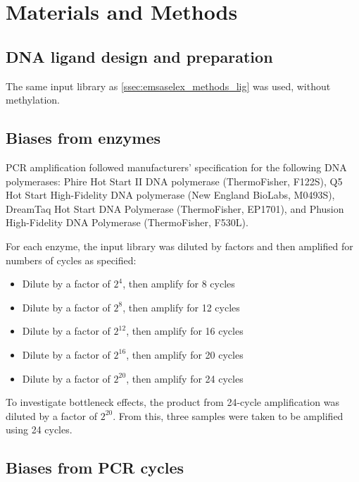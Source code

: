 \documentclass[parskip=full, numbers=noenddot]{scrreprt}
\begin{document}
\section{Materials and Methods}
\label{sec:pcrbias_methods}

\subsection{DNA ligand design and preparation}
\label{ssec:pcrbias_methods_lig}

The same input library as \ref{ssec:emsaselex_methods_lig} was used, without methylation.

\subsection{Biases from enzymes}
\label{ssec:pcrbias_methods_enz}

PCR amplification followed manufacturers' specification for the following DNA polymerases: Phire Hot Start II DNA polymerase (ThermoFisher, F122S), Q5 Hot Start High-Fidelity DNA polymerase (New England BioLabs, M0493S), DreamTaq Hot Start DNA Polymerase (ThermoFisher, EP1701), and Phusion High-Fidelity DNA Polymerase (ThermoFisher, F530L).

For each enzyme, the input library was diluted by factors and then amplified for numbers of cycles as specified:

\begin{itemize}
  \item Dilute by a factor of $2^{4}$, then amplify for 8 cycles
  \item Dilute by a factor of $2^{8}$, then amplify for 12 cycles
  \item Dilute by a factor of $2^{12}$, then amplify for 16 cycles
  \item Dilute by a factor of $2^{16}$, then amplify for 20 cycles
  \item Dilute by a factor of $2^{20}$, then amplify for 24 cycles
\end{itemize}
    
To investigate bottleneck effects, the product from 24-cycle amplification was diluted by a factor of $2^{20}$.  From this, three samples were taken to be amplified using 24 cycles.

\subsection{Biases from PCR cycles}
\label{ssec:pcrbias_methods_pcr}
\end{document}
